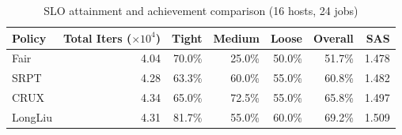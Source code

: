 \begin{table}[t]
\centering
\caption{SLO attainment and achievement comparison (16 hosts, 24 jobs)}
\label{tab:slo_16host}
\begin{tabular}{l|r|r|r|r|r|r}
\hline
Policy & Total Iters ($\times 10^4$) & Tight & Medium & Loose & Overall & SAS \\
\hline
Fair & 4.04 & 70.0\% & 25.0\% & 50.0\% & 51.7\% & 1.478 \\
SRPT & 4.28 & 63.3\% & 60.0\% & 55.0\% & 60.8\% & 1.482 \\
CRUX & 4.34 & 65.0\% & 72.5\% & 55.0\% & 65.8\% & 1.497 \\
LongLiu & 4.31 & 81.7\% & 55.0\% & 60.0\% & 69.2\% & 1.509 \\
\hline
\end{tabular}
\end{table}
